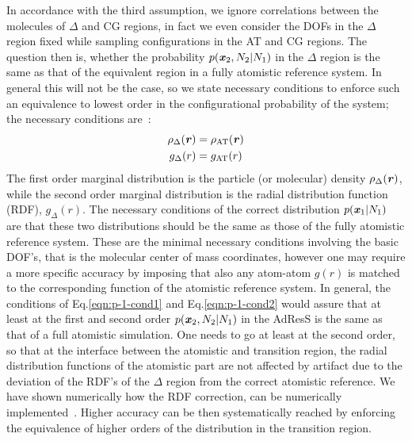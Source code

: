 \documentclass[aip,jcp,a4paper,reprint,onecolumn]{revtex4-1}
\newcommand{\vect}[1]{\textbf{\textit{#1}}}
\newcommand{\AT}{{\textrm{{AT}}}}
\newcommand{\HY}{{\Delta}}
\begin{document}
In accordance with the third assumption, we ignore correlations between the molecules of $\HY$ and CG regions, in fact we even consider the DOFs in the $\HY$ region fixed 
  while sampling configurations in the AT and CG regions. 
The question then is, whether the probability $p(\vect
x_2, N_2 | N_1)$ in the $\HY$ region  is the same as that of the equivalent region in a fully atomistic reference
system. In general this will not be the case, so we 
state necessary conditions to enforce such an equivalence to lowest order in the configurational probability of the system; the necessary conditions are~\cite{rdfcorr}:
\begin{align}\label{eqn:p-1-cond1}
  \rho_{\HY}(\vect r) &= \rho_{\AT}(\vect r)\\\label{eqn:p-1-cond2}
  g_{\HY}( r) &= g_{\AT}(r)
\end{align}
The first order marginal distribution is the particle (or molecular) density 
$\rho_{\HY}(\vect r)$, while the second order marginal distribution is
the radial distribution function (RDF), $g_{\HY}(r)$. 
The necessary
conditions of the correct distribution $p(\vect x_1|N_1)$
are that these two distributions should be the same as those of the fully atomistic reference system. 
These are the minimal necessary conditions involving the basic DOF's, that is the molecular center of mass coordinates, however one may require a more specific accuracy by imposing that also any atom-atom $g(r)$ is matched to the corresponding function of the atomistic reference system. 
In general, the conditions of Eq.\ref{eqn:p-1-cond1} and Eq.\ref{eqn:p-1-cond2} would assure that at least at the first and second order $p(\vect x_2, N_2 | N_1)$ in the AdResS is the same as that of a full atomistic simulation. One needs to go at least at the second order, so that at the interface between the atomistic and transition region, the radial distribution functions of the atomistic part are not affected by artifact due to the deviation of the RDF's of the $\HY$ region from the correct atomistic reference. 
We have shown numerically how the RDF correction, can be numerically implemented~\cite{rdfcorr}.
Higher accuracy can be then systematically reached by enforcing the equivalence of higher orders of the distribution in the transition region.
\end{document}
